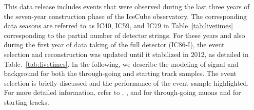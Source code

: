 \documentclass[aps,10pt,prd,twocolumn,floats,letterpaper,showpacs,nofootinbib,bibnotes,notitlepage,superscriptaddress,floatfix]{revtex4-1}
\newcommand{\MA}[1]{{\color{black}#1}}
\begin{document}
This data release includes events that were observed during the last three years of the seven-year construction phase of the IceCube observatory. The corresponding data seasons are referred to as IC40, IC59, and IC79 in Table~\ref{tab:livetimes} corresponding to the partial number of detector strings. For these years and also during the first year of data taking of the full detector (IC86-I), the event selection and reconstruction was updated until it stabilized in 2012, as detailed in Table.~\ref{tab:livetimes}. In the following, we describe the modeling of signal and background for both the through-going and starting track samples.  The event selection is briefly discussed and the performance of the event sample highlighted. For more detailed information, refer to \cite{Abbasi:2010rd}, \cite{Aartsen:2013uuv}, and \cite{Aartsen:2014cva} for through-going muons and \cite{Aartsen:2016tpb} for starting tracks.



\end{document}
